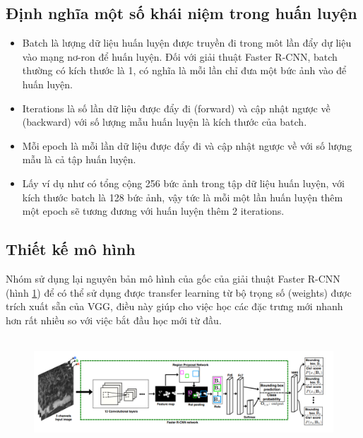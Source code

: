 \subsection{Định nghĩa một số khái niệm trong huấn luyện}
\begin{itemize}
	\item Batch là lượng dữ liệu huấn luyện được truyền đi trong môt lần đẩy dự liệu vào mạng nơ-ron để huấn luyện. Đối với giải thuật Faster R-CNN, batch thường có kích thước là 1, có nghĩa là mỗi lần chỉ đưa một bức ảnh vào để huấn luyện.  
	\item Iterations là số lần dữ liệu được đẩy đi (forward) và cập nhật ngược về (backward) với số lượng mẫu huấn luyện là kích thước của batch.
	\item Mỗi epoch là mỗi lần dữ liệu được đẩy đi và cập nhật ngược về với số lượng mẫu là cả tập huấn luyện.
	\item Lấy ví dụ như có tổng cộng 256 bức ảnh trong tập dữ liệu huấn luyện, với kích thước batch là 128 bức ảnh, vậy tức là mỗi một lần huấn luyện thêm một epoch sẽ tương đương với huấn luyện thêm 2 iterations.
\end{itemize}
\cleardoublepage
\subsection{Thiết kế mô hình}
Nhóm sử dụng lại nguyên bản mô hình của gốc của giải thuật Faster R-CNN (hình \ref{chap3:original_faster}) để có thể sử dụng được transfer learning từ bộ trọng số (weights) được trích xuất sẵn của VGG, điều này giúp cho việc học các đặc trưng mới nhanh hơn rất nhiều so với việc bắt đầu học mới từ đầu.
~\\
~\\
\begin{figure}[H]
  \centering
  \includegraphics[width=1\textwidth]{images/chap3/fasterRCNN.png}
  \label{chap3:original_faster}    
\end{figure}

